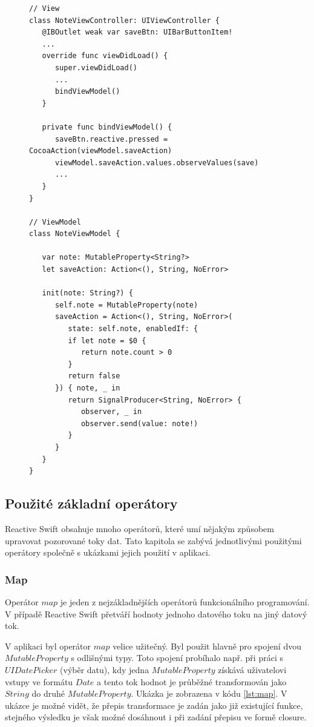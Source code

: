 \documentclass[thesis=M,czech]{FITthesis}[2012/06/26]
\begin{document}
\begin{figure}
\begin{minipage}{\linewidth}
\begin{lstlisting}[caption={Ukázka použití Action},label={lst:action}]
// View
class NoteViewController: UIViewController {
   @IBOutlet weak var saveBtn: UIBarButtonItem!
   ...
   override func viewDidLoad() {
      super.viewDidLoad()
      ...
      bindViewModel()
   }
   
   private func bindViewModel() {
      saveBtn.reactive.pressed = CocoaAction(viewModel.saveAction)
      viewModel.saveAction.values.observeValues(save)
      ...
   }  
} 

// ViewModel
class NoteViewModel {
    
   var note: MutableProperty<String?>
   let saveAction: Action<(), String, NoError>
   
   init(note: String?) {
      self.note = MutableProperty(note)
      saveAction = Action<(), String, NoError>(
         state: self.note, enabledIf: {
         if let note = $0 {
            return note.count > 0
         }
         return false
      }) { note, _ in
         return SignalProducer<String, NoError> { 
            observer, _ in
            observer.send(value: note!)
         }
      }
   }
}
\end{lstlisting}
\end{minipage}
\end{figure}	

\subsection{Použité základní operátory}
Reactive Swift obsahuje mnoho operátorů, které umí nějakým způsobem upravovat pozorované toky dat. Tato kapitola se zabývá jednotlivými použitými operátory společně s ukázkami jejich použití v aplikaci.

\subsubsection{Map}
Operátor $map$ je jeden z nejzákladnějších operátorů funkcionálního programování. V případě Reactive Swift přetváří hodnoty jednoho datového toku na jiný datový tok. \cite{operators}

V aplikaci byl operátor $map$ velice užitečný. Byl použit hlavně pro spojení dvou $MutableProperty$ s odlišnými typy. Toto spojení probíhalo např. při práci s $UIDatePicker$ (výběr datu), kdy jedna $MutableProperty$ získává uživatelovi vstupy ve formátu $Date$ a tento tok hodnot je průběžné transformován jako $String$ do druhé $MutableProperty$. Ukázka je zobrazena v kódu \ref{lst:map}. V ukázce je možné vidět, že přepis transformace je zadán jako již existující funkce, stejného výsledku je však možné dosáhnout i při zadání přepisu ve formě closure.
\end{document}
